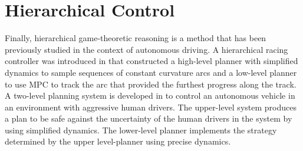 \section{Hierarchical Control}
Finally, hierarchical game-theoretic reasoning is a method that has been previously studied in the context of autonomous driving. A hierarchical racing controller was introduced in \cite{hierracing} that constructed a high-level planner with simplified dynamics to sample sequences of constant curvature arcs and a low-level planner to use MPC to track the arc that provided the furthest progress along the track. A two-level planning system is developed in \cite{heirarchicalg} to control an autonomous vehicle in an environment with aggressive human drivers. The upper-level system produces a plan to be safe against the uncertainty of the human drivers in the system by using simplified dynamics. The lower-level planner implements the strategy determined by the upper level-planner using precise dynamics.